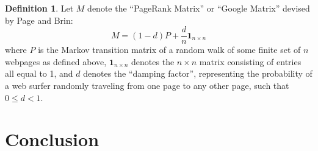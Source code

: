 \documentclass[11pt]{article}
\theoremstyle{definition}
\newtheorem{definition}[theorem]{Definition}
\renewcommand{\vec}[1]{\mathbf{#1}}
\begin{document}



\begin{definition}
    Let $M$ denote the ``PageRank Matrix'' or ``Google Matrix'' devised by Page and Brin:
    $$M = (1-d)P + \frac{d}{n} \vec{1}_{n \times n}$$
    where $P$ is the Markov transition matrix of a random walk of some finite set of $n$ webpages as defined above,
    $\vec{1}_{n \times n}$ denotes the $n \times n$ matrix consisting of entries all equal to 1,
    and $d$ denotes the ``damping factor'', representing the probability of a web surfer randomly traveling from one page to any other page,
    such that $0 \leq d < 1$.
\end{definition}



\section{Conclusion}



\begin{thebibliography}{9}
\bibitem{}

\end{thebibliography}
\end{document}
